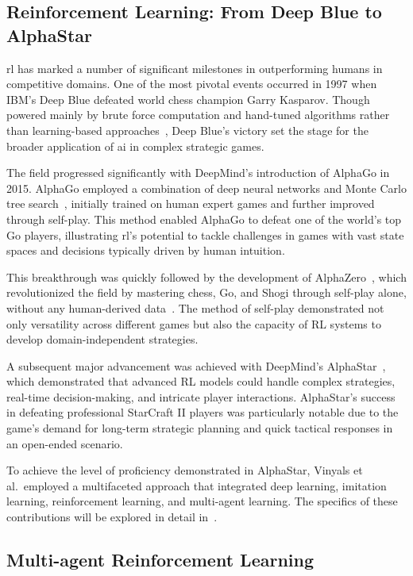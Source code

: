     \subsection*{Reinforcement Learning: From Deep Blue to AlphaStar}

\gls{rl} has marked a number of significant milestones in outperforming humans in 
competitive domains. One of the most pivotal events occurred in 1997 
when IBM's Deep Blue defeated world chess champion Garry Kasparov. 
Though powered mainly by brute force computation and hand-tuned algorithms
rather than learning-based approaches~\cite{campbell2002}, Deep Blue's victory set 
the stage for the broader application of \gls{ai} in complex strategic games.

The field progressed significantly with DeepMind's introduction of AlphaGo in 2015. AlphaGo 
employed a combination of deep neural networks and Monte Carlo tree search~\cite{silver2016},
initially trained on human expert games and further improved through self-play.
This method enabled AlphaGo to defeat one of the world's top Go players, illustrating \gls{rl}'s
potential to tackle challenges in games with vast state spaces and decisions typically driven by
human intuition.

This breakthrough was quickly followed by the development of AlphaZero~\cite{silver2017},
which revolutionized the field by mastering chess, Go, and Shogi through self-play alone,
without any human-derived data~\cite{silver2017a}.
The method of self-play demonstrated not only versatility across different games but also the
capacity of RL systems to develop domain-independent strategies.

A subsequent major advancement was achieved with DeepMind's AlphaStar~\cite{vinyals2019},
which demonstrated that advanced RL models could handle complex strategies,
real-time decision-making, and intricate player interactions. AlphaStar's success in 
defeating professional StarCraft II players was particularly notable due to the game's demand 
for long-term strategic planning and quick tactical responses in an open-ended scenario.

To achieve the level of proficiency demonstrated in AlphaStar, Vinyals et al.~employed a 
multifaceted approach that integrated deep learning, imitation learning, reinforcement learning, 
and multi-agent learning. The specifics of these contributions will be explored in 
detail in~.


    \subsection*{Multi-agent Reinforcement Learning}%

